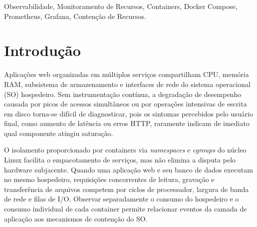 \documentclass[conference]{IEEEtran}
\begin{document}
\begin{abstract}
Este trabalho apresenta o projeto, a implantação e a validação experimental de uma arquitetura de observabilidade para monitoramento de recursos do sistema operacional hospedeiro e de containers em ambiente orquestrado via Docker Compose. A pilha de coleta e visualização combina Node Exporter, cAdvisor, Prometheus e Grafana para acompanhar utilização de processador (CPU), memória principal (RAM), operações de entrada e saída (I/O) de disco e tráfego de rede. Como sistema alvo, utilizou-se uma instância local isolada da plataforma educacional CreateJoy, executada sobre PHP 8.3 com Apache e banco de dados MariaDB 11.4 populado exclusivamente com registros fictícios. Foram executados dois conjuntos de testes de carga em Python com Locust: o primeiro elevou a concorrência para 10, 50 e 100 alunos simultâneos em consultas e solicitações na loja, atingindo 3.380 requisições sem falhas (75,46 req/s) e elevando a CPU do banco de 0,88\% para 43,65\% e a RAM da aplicação de 20,26 MiB para 175,87 MiB; o segundo submeteu atividades simultâneas com arquivos de 1 KB, 100 KB e 5 MB, elevando a escrita em disco do container da aplicação para 3,57 MB/s (6,43 MB/s no hospedeiro), o tráfego recebido para 11,22 MB/s e as entregas pendentes de 1 para 509. Os resultados mostram como a contenção de CPU, memória, disco e rede varia conforme o perfil de carga.
\end{abstract}

\begin{IEEEkeywords}
Observabilidade, Monitoramento de Recursos, Containers, Docker Compose, Prometheus, Grafana, Contenção de Recursos.
\end{IEEEkeywords}

\section{Introdução}

Aplicações web organizadas em múltiplos serviços compartilham CPU, memória RAM, subsistema de armazenamento e interfaces de rede do sistema operacional (SO) hospedeiro. Sem instrumentação contínua, a degradação de desempenho causada por picos de acessos simultâneos ou por operações intensivas de escrita em disco torna-se difícil de diagnosticar, pois os sintomas percebidos pelo usuário final, como aumento de latência ou erros HTTP, raramente indicam de imediato qual componente atingiu saturação.

O isolamento proporcionado por containers via \textit{namespaces} e \textit{cgroups} do núcleo Linux facilita o empacotamento de serviços, mas não elimina a disputa pelo hardware subjacente. Quando uma aplicação web e seu banco de dados executam no mesmo hospedeiro, requisições concorrentes de leitura, gravação e transferência de arquivos competem por ciclos de processador, largura de banda de rede e filas de I/O. Observar separadamente o consumo do hospedeiro e o consumo individual de cada container permite relacionar eventos da camada de aplicação aos mecanismos de contenção do SO.
\end{document}
